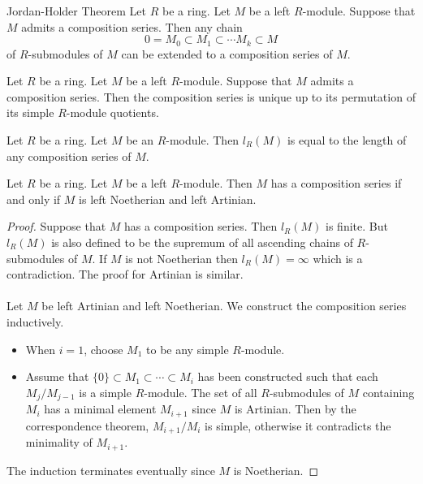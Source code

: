 \documentclass[a4paper]{article}
\begin{document}
\begin{thm}{Jordan-Holder Theorem}{} Let $R$ be a ring. Let $M$ be a left $R$-module. Suppose that $M$ admits a composition series. Then any chain $$0=M_0\subset M_1\subset\cdots M_k\subset M$$ of $R$-submodules of $M$ can be extended to a composition series of $M$. 
\end{thm}

\begin{prp}{}{} Let $R$ be a ring. Let $M$ be a left $R$-module. Suppose that $M$ admits a composition series. Then the composition series is unique up to its permutation of its simple $R$-module quotients. 
\end{prp}

\begin{prp}{}{} Let $R$ be a ring. Let $M$ be an $R$-module. Then $l_R(M)$ is equal to the length of any composition series of $M$. 
\end{prp}

\begin{prp}{}{} Let $R$ be a ring. Let $M$ be a left $R$-module. Then $M$ has a composition series if and only if $M$ is left Noetherian and left Artinian. 
\begin{proof}
Suppose that $M$ has a composition series. Then $l_R(M)$ is finite. But $l_R(M)$ is also defined to be the supremum of all ascending chains of $R$-submodules of $M$. If $M$ is not Noetherian then $l_R(M)=\infty$ which is a contradiction. The proof for Artinian is similar. \\~\\

Let $M$ be left Artinian and left Noetherian. We construct the composition series inductively. 
\begin{itemize}
\item When $i=1$, choose $M_1$ to be any simple $R$-module. 
\item Assume that $\{0\}\subset M_1\subset\cdots\subset M_i$ has been constructed such that each $M_j/M_{j-1}$ is a simple $R$-module. The set of all $R$-submodules of $M$ containing $M_i$ has a minimal element $M_{i+1}$ since $M$ is Artinian. Then by the correspondence theorem, $M_{i+1}/M_i$ is simple, otherwise it contradicts the minimality of $M_{i+1}$. 
\end{itemize}
The induction terminates eventually since $M$ is Noetherian. 
\end{proof}
\end{prp}
\end{document}
